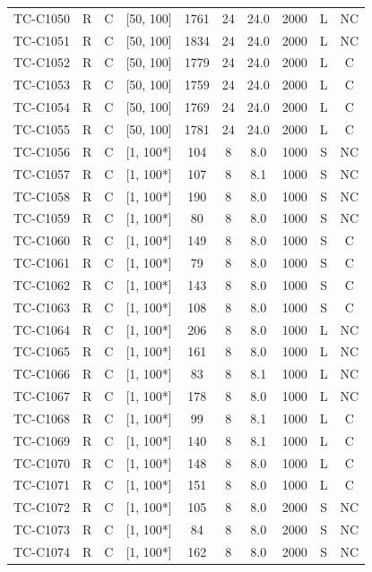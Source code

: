 \begin{longtable}{lccccccccc}
TC-C1050 & R & C & [50, 100] & 1761 & 24 & 24.0 & 2000 & L & NC \\
TC-C1051 & R & C & [50, 100] & 1834 & 24 & 24.0 & 2000 & L & NC \\
TC-C1052 & R & C & [50, 100] & 1779 & 24 & 24.0 & 2000 & L & C \\
TC-C1053 & R & C & [50, 100] & 1759 & 24 & 24.0 & 2000 & L & C \\
TC-C1054 & R & C & [50, 100] & 1769 & 24 & 24.0 & 2000 & L & C \\
TC-C1055 & R & C & [50, 100] & 1781 & 24 & 24.0 & 2000 & L & C \\
TC-C1056 & R & C & [1, 100*] & 104 & 8 & 8.0 & 1000 & S & NC \\
TC-C1057 & R & C & [1, 100*] & 107 & 8 & 8.1 & 1000 & S & NC \\
TC-C1058 & R & C & [1, 100*] & 190 & 8 & 8.0 & 1000 & S & NC \\
TC-C1059 & R & C & [1, 100*] & 80 & 8 & 8.0 & 1000 & S & NC \\
TC-C1060 & R & C & [1, 100*] & 149 & 8 & 8.0 & 1000 & S & C \\
TC-C1061 & R & C & [1, 100*] & 79 & 8 & 8.0 & 1000 & S & C \\
TC-C1062 & R & C & [1, 100*] & 143 & 8 & 8.0 & 1000 & S & C \\
TC-C1063 & R & C & [1, 100*] & 108 & 8 & 8.0 & 1000 & S & C \\
TC-C1064 & R & C & [1, 100*] & 206 & 8 & 8.0 & 1000 & L & NC \\
TC-C1065 & R & C & [1, 100*] & 161 & 8 & 8.0 & 1000 & L & NC \\
TC-C1066 & R & C & [1, 100*] & 83 & 8 & 8.1 & 1000 & L & NC \\
TC-C1067 & R & C & [1, 100*] & 178 & 8 & 8.0 & 1000 & L & NC \\
TC-C1068 & R & C & [1, 100*] & 99 & 8 & 8.1 & 1000 & L & C \\
TC-C1069 & R & C & [1, 100*] & 140 & 8 & 8.1 & 1000 & L & C \\
TC-C1070 & R & C & [1, 100*] & 148 & 8 & 8.0 & 1000 & L & C \\
TC-C1071 & R & C & [1, 100*] & 151 & 8 & 8.0 & 1000 & L & C \\
TC-C1072 & R & C & [1, 100*] & 105 & 8 & 8.0 & 2000 & S & NC \\
TC-C1073 & R & C & [1, 100*] & 84 & 8 & 8.0 & 2000 & S & NC \\
TC-C1074 & R & C & [1, 100*] & 162 & 8 & 8.0 & 2000 & S & NC \\

\end{longtable}
